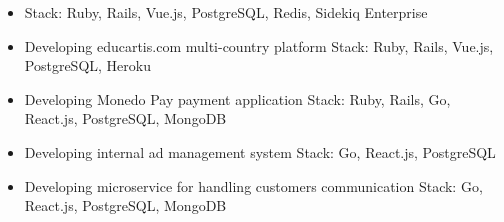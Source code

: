 \documentclass[10pt,a4paper,ragged2e]{altacv}
\begin{document}

\begin{fullwidth}
\makecvheader
\end{fullwidth}



\begin{itemize}
\item Stack: Ruby, Rails, Vue.js, PostgreSQL, Redis, Sidekiq Enterprise
\end{itemize}

\divider

\begin{itemize}
\item Developing educartis.com multi-country platform \newline
Stack: Ruby, Rails, Vue.js, PostgreSQL, Heroku
\end{itemize}

\begin{itemize}
\item Developing Monedo Pay payment application \newline
Stack: Ruby, Rails, Go, React.js, PostgreSQL, MongoDB \newline

\item Developing internal ad management system \newline
Stack: Go, React.js, PostgreSQL

\item Developing microservice for handling customers communication \newline
Stack: Go, React.js, PostgreSQL, MongoDB
\end{itemize}
\end{document}
